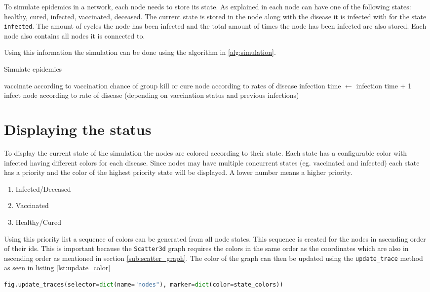 To simulate epidemics in a network, each node needs to store its state. As explained in %
each node can have one of the following states: healthy, cured, infected, vaccinated, deceased. The current state is stored in the node along with the disease it is infected with for the state \texttt{infected}. The amount of cycles the node has been infected and the total amount of times the node has been infected are also stored. Each node also contains all nodes it is connected to.

Using this information the simulation can be done using the algorithm in \ref{alg:simulation}.

\begin{algorithm}
\caption{Simulate epidemics}
\label{alg:simulation}
\begin{algorithmic}
        \State vaccinate according to vaccination chance of group
    \EndIf
            \State kill or cure node according to rates of disease
        \Else
            \State infection time $\gets$ infection time + 1
                \State infect node according to rate of disease 
                \State (depending on vaccination status and previous infections)
            \EndFor
        \EndIf
    \EndIf
\EndFor
\end{algorithmic}
\end{algorithm}

\section{Displaying the status}
To display the current state of the simulation the nodes are colored according to their state. Each state has a configurable color with infected having different colors for each disease. Since nodes may have multiple concurrent states (eg. vaccinated and infected) each state has a priority and the color of the highest priority state will be displayed. A lower number means a higher priority.
\begin{enumerate}
    \item Infected/Deceased
    \item Vaccinated
    \item Healthy/Cured
\end{enumerate}

Using this priority list a sequence of colors can be generated from all node states. This sequence is created for the nodes in ascending order of their ids. This is important because the \texttt{Scatter3d} graph requires the colors in the same order as the coordinates which are also in ascending order as mentioned in section \ref{sub:scatter_graph}. The color of the graph can then be updated using the \texttt{update\_trace} method as seen in listing \ref{lst:update_color}

\begin{lstlisting}[language=python, caption={Updating the colors of the graph}, label={lst:update_color}]
fig.update_traces(selector=dict(name="nodes"), marker=dict(color=state_colors))
\end{lstlisting}